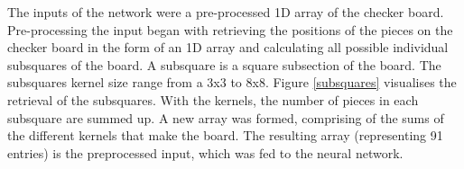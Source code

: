 \documentclass[12pt,a4paper]{article}
\begin{document}
\begin{figure}[ht!]
        \end{figure}
        

        The inputs of the network were a pre-processed 1D array of the checker board. Pre-processing the input began with retrieving the positions of the pieces on the checker board in the form of an 1D array and calculating all possible individual subsquares of the board. A subsquare is a square subsection of the board. The subsquares kernel size range from a 3x3 to 8x8. Figure \ref{subsquares} visualises the retrieval of the subsquares. With the kernels, the number of pieces in each subsquare are summed up. A new array was formed, comprising of the sums of the different kernels that make the board. The resulting array (representing 91 entries) is the preprocessed input, which was fed to the neural network.
        
\end{document}
